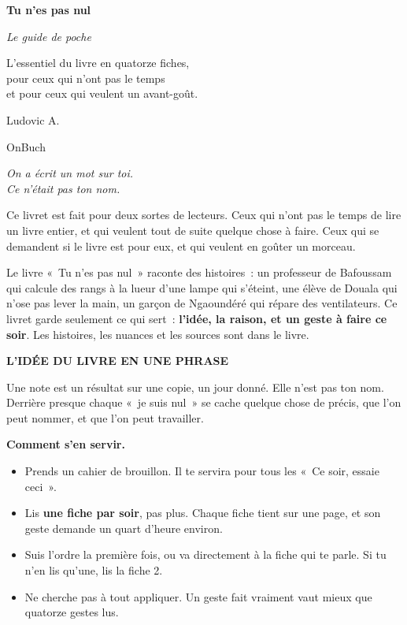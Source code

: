\documentclass[10pt,twoside,openany]{book}
\newenvironment{aretenir}[1][À retenir]{\par\begin{tcolorbox}[enhanced,colback=creme,colframe=accent,boxrule=0pt,leftrule=3pt,arc=0pt,left=8pt,right=8pt,top=5pt,bottom=5pt,breakable]{\small\bfseries\color{accent}\MakeUppercase{#1}}\par\smallskip}{\end{tcolorbox}\par}
\newcommand{\titre}[1]{\clearpage\markright{#1}\thispagestyle{plain}{\noindent\LARGE\bfseries #1\par}\vspace{0.8em}}
\begin{document}
\frontmatter
\thispagestyle{empty}
\begin{center}\vspace*{2.2cm}
{\Huge\bfseries Tu n’es pas nul\par}\vspace{0.4cm}
{\large\itshape Le guide de poche\par}\vspace{1.2cm}
{\large L’essentiel du livre en quatorze fiches,\\pour ceux qui n’ont pas le temps\\et pour ceux qui veulent un avant-goût.\par}\vspace{2cm}
{\Large Ludovic A.\par}\vfill{\small OnBuch\par}\end{center}
\clearpage
\thispagestyle{empty}\vspace*{\fill}\begin{center}\itshape On a écrit un mot sur toi.\\Ce n’était pas ton nom.\end{center}\vspace*{\fill}
\mainmatter
\titre{Avant de commencer}
Ce livret est fait pour deux sortes de lecteurs. Ceux qui n’ont pas le temps de lire un livre entier, et qui veulent tout de suite quelque chose à faire. Ceux qui se demandent si le livre est pour eux, et qui veulent en goûter un morceau.

Le livre « Tu n’es pas nul » raconte des histoires : un professeur de Bafoussam qui calcule des rangs à la lueur d’une lampe qui s’éteint, une élève de Douala qui n’ose pas lever la main, un garçon de Ngaoundéré qui répare des ventilateurs. Ce livret garde seulement ce qui sert : \textbf{l’idée, la raison, et un geste à faire ce soir}. Les histoires, les nuances et les sources sont dans le livre.

\begin{aretenir}[L’idée du livre en une phrase]
Une note est un résultat sur une copie, un jour donné. Elle n’est pas ton nom. Derrière presque chaque « je suis nul » se cache quelque chose de précis, que l’on peut nommer, et que l’on peut travailler.
\end{aretenir}

\textbf{Comment s’en servir.}
\begin{itemize}
\item Prends un cahier de brouillon. Il te servira pour tous les « Ce soir, essaie ceci ».
\item Lis \textbf{une fiche par soir}, pas plus. Chaque fiche tient sur une page, et son geste demande un quart d’heure environ.
\item Suis l’ordre la première fois, ou va directement à la fiche qui te parle. Si tu n’en lis qu’une, lis la fiche 2.
\item Ne cherche pas à tout appliquer. Un geste fait vraiment vaut mieux que quatorze gestes lus.
\end{itemize}
\end{document}
